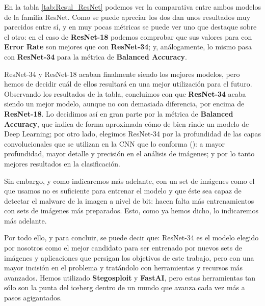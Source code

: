 En la tabla \ref{tab:Resul_ResNet} podemos ver la comparativa entre ambos modelos de la familia ResNet. Como se puede apreciar los dos dan unos resultados muy parecidos entre sí, y en muy pocas métricas se puede ver uno que destaque sobre el otro: en el caso de \textbf{ResNet-18} podemos comprobar que sus valores para con \textbf{Error Rate} son mejores que con \textbf{ResNet-34}; y, análogamente, lo mismo pasa con \textbf{ResNet-34} para la métrica de \textbf{Balanced Accuracy}.

ResNet-34 y ResNet-18 acaban finalmente siendo los mejores modelos, pero hemos de decidir cuál de ellos resultará en una mejor utilización para el futuro. Observando los resultados de la tabla, concluimos con que \textbf{ResNet-34} acaba siendo un mejor modelo, aunque no con demasiada diferencia, por encima de \textbf{ResNet-18}. Lo decidimos así en gran parte por la métrica de \textbf{Balanced Accuracy}, que indica de forma aproximada cómo de bien rinde un modelo de Deep Learning; por otro lado, elegimos ResNet-34 por la profundidad de las capas convolucionales que se utilizan en la \ac{CNN} que lo conforma (\cite{cnn}): a mayor profundidad, mayor detalle y precisión en el análisis de imágenes; y por lo tanto mejores resultados en la clasificación.

Sin embargo, y como indicaremos más adelante, con un set de imágenes como el que usamos no es suficiente para entrenar el modelo y que éste sea capaz de detectar el malware de la imagen a nivel de bit: hacen falta más entrenamientos con sets de imágenes más preparados. Esto, como ya hemos dicho, lo indicaremos más adelante.

Por todo ello, y para concluir, se puede decir que: ResNet-34 es el modelo elegido por nosotros como el mejor candidato para ser entrenado por nuevos sets de imágenes y aplicaciones que persigan los objetivos de este trabajo, pero con una mayor incisión en el problema y tratándolo con herramientas y recursos más avanzados. Hemos utilizado \textbf{Stegosploit} y \textbf{FastAI}, pero estas herramientas tan sólo son la punta del iceberg dentro de un mundo que avanza cada vez más a pasos agigantados.